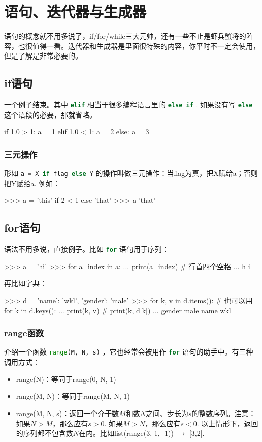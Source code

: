 \documentclass[a4paper,12pt]{report}
\newcommand{\pyline}[1]{{ \lstinline[language=Python, basicstyle=\ttfamily]{#1} }}
\newcommand{\python}{{\ttfamily{Python}}}
\newenvironment{feai}{\begin{itemize}[font=\bfseries]}
    {\end{itemize}}
\begin{document}
\chapter{语句、迭代器与生成器}
语句的概念就不用多说了，if/for/while三大元帅，还有一些不止是虾兵蟹将的阵容，也很值得一看。迭代器和生成器是\python 里面很特殊的内容，你平时不一定会使用，但是了解是非常必要的。

\section{if语句}
一个例子结束。其中\pyline{elif}相当于很多编程语言里的\pyline{else if}. 如果没有写\pyline{else}这个语段的必要，那就省略。
\begin{py}
if 1.0 > 1:
    a = 1
elif 1.0 < 1:
    a = 2
else: 
    a = 3
\end{py}

\subsection{三元操作}
形如\pyline{a = X if flag else Y}的操作叫做三元操作：当flag为真，把X赋给a；否则把Y赋给a. 例如：
\begin{py}
>>> a = 'this' if 2 < 1 else 'that'
>>> a
'that'
\end{py}

\section{for语句}
\label{sec:for}
语法不用多说，直接例子。比如\pyline{for}语句用于序列：
\begin{py}
>>> a = 'hi'
>>> for a_index in a:   
...     print(a_index)  # 行首四个空格
...
h
i
\end{py}

再比如字典：
\begin{py}
>>> d = {'name': 'wkl', 'gender': 'male'}
>>> for k, v in d.items():  # 也可以用for k in d.keys():
...     print(k, v)         #             print(k, d[k])
...
gender male
name wkl
\end{py}

\subsection{range函数}
介绍一个函数\pyline{range(M, N, s)}，它也经常会被用作\pyline{for}语句的助手中。有三种调用方式：
\begin{feai}
\item range(N)：等同于range(0, N, 1)
\item range(M, N)：等同于range(M, N, 1)
\item range(M, N, s)：返回一个介于数$M$和数$N$之间、步长为$s$的整数序列。注意：如果$N>M$，那么应有$s>0$. 如果$M>N$，那么应有$s<0$. 以上情形下，返回的序列都不包含数$N$在内。比如list(range(3, 1, -1)) $\rightarrow$ [3,2]. 
\end{feai}
\end{document}
